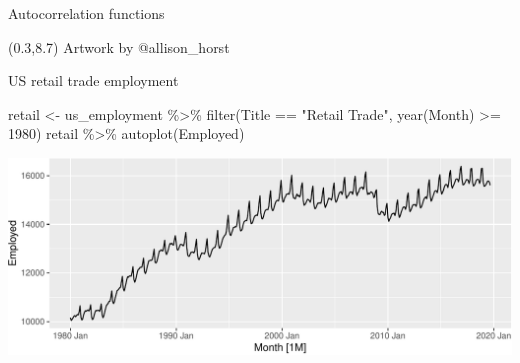 \documentclass[14pt,ignorenonframetext,aspectratio=169]{beamer}
\newenvironment{Shaded}{\begin{snugshade}}{\end{snugshade}}
\newcommand{\DecValTok}[1]{\textcolor[rgb]{0.00,0.00,0.81}{#1}}
\newcommand{\FunctionTok}[1]{\textcolor[rgb]{0.00,0.00,0.00}{#1}}
\newcommand{\NormalTok}[1]{#1}
\newcommand{\OtherTok}[1]{\textcolor[rgb]{0.56,0.35,0.01}{#1}}
\newcommand{\SpecialCharTok}[1]{\textcolor[rgb]{0.00,0.00,0.00}{#1}}
\newcommand{\StringTok}[1]{\textcolor[rgb]{0.31,0.60,0.02}{#1}}
\renewenvironment{Shaded}{\color{black}\begin{snugshade}\color{black}}{\end{snugshade}}
\renewenvironment{Shaded}{\color{black}\fontsize{10}{10}\sf\begin{snugshade}\color{black}}{\end{snugshade}}
\begin{document}
\begin{frame}{Autocorrelation functions}

\vspace*{10cm}

\begin{textblock}{3}(0.3,8.7)\fontsize{7}{9}\sf
Artwork by @allison\_horst
\end{textblock}
\end{frame}

\begin{frame}[fragile]{US retail trade employment}
\protect\hypertarget{us-retail-trade-employment}{}
\fontsize{10}{10}\sf

\begin{Shaded}
\begin{Highlighting}[]
\NormalTok{retail }\OtherTok{\textless{}{-}}\NormalTok{ us\_employment }\SpecialCharTok{\%\textgreater{}\%}
  \FunctionTok{filter}\NormalTok{(Title }\SpecialCharTok{==} \StringTok{"Retail Trade"}\NormalTok{, }\FunctionTok{year}\NormalTok{(Month) }\SpecialCharTok{\textgreater{}=} \DecValTok{1980}\NormalTok{)}
\NormalTok{retail }\SpecialCharTok{\%\textgreater{}\%} \FunctionTok{autoplot}\NormalTok{(Employed)}
\end{Highlighting}
\end{Shaded}

\includegraphics{2-tsgraphics_files/figure-beamer/unnamed-chunk-26-1.pdf}
\end{frame}
\end{document}
